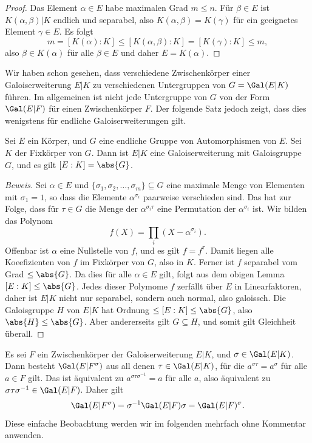 \documentclass[12pt,a4paper,twoside]{article}
\begin{document}
\begin{proof}
Das Element $\alpha\in E$ habe maximalen Grad $m\le n$. F\"ur $\beta\in E$ ist
$K(\alpha,\beta)|K$ endlich und separabel, also $K(\alpha,\beta)=K(\gamma)$
f\"ur ein geeignetes Element $\gamma\in E$. Es folgt
\[
m=[K(\alpha):K]\le [K(\alpha,\beta):K]=[K(\gamma):K]\le m,
\]
also $\beta\in K(\alpha)$ f\"ur alle $\beta\in E$ und daher $E=K(\alpha)$.
\end{proof}
Wir haben schon gesehen, dass verschiedene Zwischenk\"orper einer
Galoiserweiterung $E|K$ zu verschiedenen Untergruppen von $G=\Gal(E|K)$
f\"uhren. Im allgemeinen ist nicht jede Untergruppe von $G$ von der Form
$\Gal(E|F)$ f\"ur einen Zwischenk\"orper $F$. Der folgende Satz jedoch zeigt,
dass dies wenigstens f\"ur endliche Galoiserweiterungen gilt.
\begin{Satz}[E.\ Artin]
  Sei $E$ ein K\"orper, und $G$ eine endliche Gruppe von Automorphismen von
  $E$. Sei $K$ der Fixk\"orper von $G$. Dann ist $E|K$ eine Galoiserweiterung
  mit Galoisgruppe $G$, und es gilt $[E:K]=\abs{G}$.
\end{Satz}
\begin{proof}[Beweis]
  Sei $\alpha\in E$ und $\{\sigma_1,\sigma_2,\dots,\sigma_m\}\subseteq G$ eine
  maximale Menge von Elementen mit $\sigma_1=1$, so dass die Elemente
  $\alpha^{\sigma_i}$ paarweise verschieden sind. Das hat zur Folge, dass
  f\"ur $\tau\in G$ die Menge der $\alpha^{\sigma_i\tau}$ eine Permutation der
  $\alpha^{\sigma_i}$ ist. Wir bilden das Polynom
\[
f(X)=\prod_{i}(X-\alpha^{\sigma_i}).
\]
Offenbar ist $\alpha$ eine Nullstelle von $f$, und es gilt $f=f^\tau$. Damit
liegen alle Koeefizienten von $f$ im Fixk\"orper von $G$, also in $K$. Ferner
ist $f$ separabel vom Grad $\le\abs{G}$.  Da dies f\"ur alle $\alpha\in E$
gilt, folgt aus dem obigen Lemma $[E:K]\le\abs{G}$. Jedes dieser Polymome $f$
zerf\"allt \"uber $E$ in Linearfaktoren, daher ist $E|K$ nicht nur separabel,
sondern auch normal, also galoissch. Die Galoisgruppe $H$ von $E|K$ hat
Ordnung $\le [E:K]\le\abs{G}$, also $\abs{H}\le\abs{G}$. Aber andererseits
gilt $G\subseteq H$, und somit gilt Gleichheit \"uberall.
\end{proof}
Es sei $F$ ein Zwischenk\"orper der Galoiserweiterung $E|K$, und
$\sigma\in\Gal(E|K)$. Dann besteht $\Gal(E|F^\sigma)$ aus all denen
$\tau\in\Gal(E|K)$, f\"ur die $a^{\sigma\tau}=a^\sigma$ f\"ur alle $a\in F$
gilt. Das ist \"aquivalent zu $a^{\sigma\tau\sigma^{-1}}=a$ f\"ur alle $a$,
also \"aquivalent zu $\sigma\tau\sigma^{-1}\in\Gal(E|F)$. Daher gilt
\[
\Gal(E|F^\sigma)=\sigma^{-1}\Gal(E|F)\sigma=\Gal(E|F)^\sigma.
\]
Diese einfache Beobachtung werden wir im folgenden mehrfach ohne Kommentar
anwenden.
\end{document}
